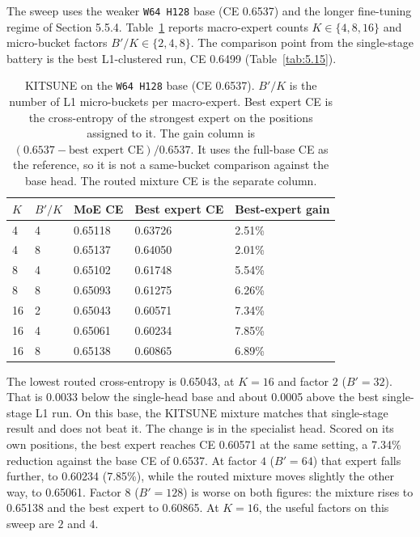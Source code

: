 The sweep uses the weaker \texttt{W64 H128} base (CE 0.6537) and the longer fine-tuning regime of Section 5.5.4. Table~\ref{tab:5.16} reports macro-expert counts $K \in \{4, 8, 16\}$ and micro-bucket factors $B'/K \in \{2, 4, 8\}$. The comparison point from the single-stage battery is the best L1-clustered run, CE 0.6499 (Table~\ref{tab:5.15}).

\begin{table}[H]
	\centering
	\small
	\begin{tabular}{lllll}
		\toprule
		$K$ & $B'/K$ & MoE CE & Best expert CE & Best-expert gain \\
		\midrule
		4 & 4 & 0.65118 & 0.63726 & 2.51\% \\
		4 & 8 & 0.65137 & 0.64050 & 2.01\% \\
		8 & 4 & 0.65102 & 0.61748 & 5.54\% \\
		8 & 8 & 0.65093 & 0.61275 & 6.26\% \\
		16 & 2 & 0.65043 & 0.60571 & 7.34\% \\
		16 & 4 & 0.65061 & 0.60234 & 7.85\% \\
		16 & 8 & 0.65138 & 0.60865 & 6.89\% \\
		\bottomrule
	\end{tabular}
	\caption{KITSUNE on the \texttt{W64 H128} base (CE 0.6537). $B'/K$ is the number of L1 micro-buckets per macro-expert. Best expert CE is the cross-entropy of the strongest expert on the positions assigned to it. The gain column is $(0.6537 - \text{best expert CE}) / 0.6537$. It uses the full-base CE as the reference, so it is not a same-bucket comparison against the base head. The routed mixture CE is the separate column.}
	\label{tab:5.16}
\end{table}

The lowest routed cross-entropy is 0.65043, at $K=16$ and factor $2$ ($B'=32$). That is 0.0033 below the single-head base and about 0.0005 above the best single-stage L1 run. On this base, the KITSUNE mixture matches that single-stage result and does not beat it. The change is in the specialist head. Scored on its own positions, the best expert reaches CE 0.60571 at the same setting, a 7.34\% reduction against the base CE of 0.6537. At factor $4$ ($B'=64$) that expert falls further, to 0.60234 (7.85\%), while the routed mixture moves slightly the other way, to 0.65061. Factor $8$ ($B'=128$) is worse on both figures: the mixture rises to 0.65138 and the best expert to 0.60865. At $K=16$, the useful factors on this sweep are $2$ and $4$.

